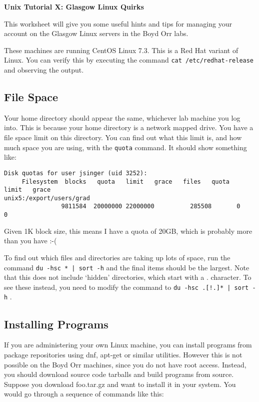 \documentclass{article}
\begin{document}
\noindent
{\Large \textsf{\textbf{Unix Tutorial X: Glasgow Linux Quirks}}}

\bigskip

This worksheet will give you some useful hints and tips
for managing your account on the Glasgow Linux servers
in the Boyd Orr labs.

These machines are running CentOS Linux 7.3.
This is a Red Hat variant of Linux. You can verify this by
executing the command \lstinline{cat /etc/redhat-release}
and observing the output.


\subsection*{File Space}

Your home directory should appear the same, whichever lab machine
you log into. This is because your home directory is a network
mapped drive. You have a file space limit on this directory. You can
find out what this limit is, and how much space you are using, with the
\lstinline{quota} command. It should show something like:

{\small
\begin{verbatim}
Disk quotas for user jsinger (uid 3252): 
     Filesystem  blocks   quota   limit   grace   files   quota   limit   grace
unix5:/export/users/grad
                9811584  20000000 22000000          285508       0       0        
\end{verbatim}
}

Given 1K block size, this means I have a quota of 20GB, which is probably more than you have :-(

To find out which files and directories are taking up lots of space,
run the command \lstinline{du -hsc * | sort -h} and the final items should be the largest.
Note that this does not include `hidden' directories, which start with a . character. To see these instead, you need to modify the command to \lstinline{du -hsc .[!.]* | sort -h} .


\subsection*{Installing Programs}

If you are administering your own Linux machine, you can install
programs from package repositories using dnf, apt-get or similar utilities. However this is not possible on the Boyd Orr machines, since
you do not have root access. Instead, you should download source code
tarballs and build programs from source. Suppose you download foo.tar.gz and want to install it in your system. You would go through a
sequence of commands like this:
\end{document}

